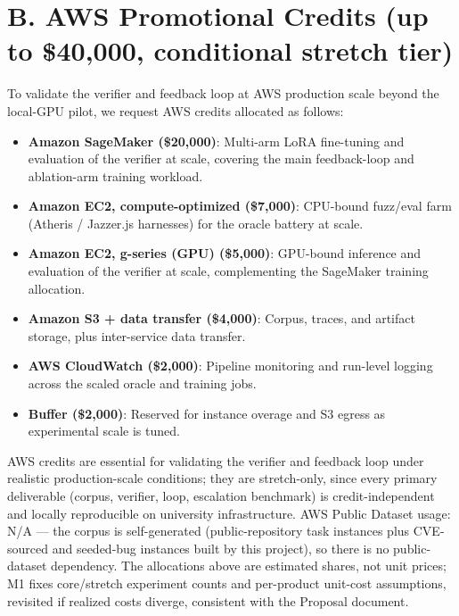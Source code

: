 \documentclass[11pt]{article}
\begin{document}
\section*{B. AWS Promotional Credits (up to \$40,000, conditional stretch tier)}
To validate the verifier and feedback loop at AWS production scale beyond the local-GPU pilot, we request AWS credits allocated as follows:
\begin{itemize}[leftmargin=1.3em, itemsep=0.5ex, topsep=2pt]
\item \textbf{Amazon SageMaker (\$20,000)}: Multi-arm LoRA fine-tuning and evaluation of the verifier at scale, covering the main feedback-loop and ablation-arm training workload.
\item \textbf{Amazon EC2, compute-optimized (\$7,000)}: CPU-bound fuzz/eval farm (Atheris / Jazzer.js harnesses) for the oracle battery at scale.
\item \textbf{Amazon EC2, g-series (GPU) (\$5,000)}: GPU-bound inference and evaluation of the verifier at scale, complementing the SageMaker training allocation.
\item \textbf{Amazon S3 + data transfer (\$4,000)}: Corpus, traces, and artifact storage, plus inter-service data transfer.
\item \textbf{AWS CloudWatch (\$2,000)}: Pipeline monitoring and run-level logging across the scaled oracle and training jobs.
\item \textbf{Buffer (\$2,000)}: Reserved for instance overage and S3 egress as experimental scale is tuned.
\end{itemize}

AWS credits are essential for validating the verifier and feedback loop under realistic production-scale conditions; they are stretch-only, since every primary deliverable (corpus, verifier, loop, escalation benchmark) is credit-independent and locally reproducible on university infrastructure. AWS Public Dataset usage: N/A --- the corpus is self-generated (public-repository task instances plus CVE-sourced and seeded-bug instances built by this project), so there is no public-dataset dependency. The allocations above are estimated shares, not unit prices; M1 fixes core/stretch experiment counts and per-product unit-cost assumptions, revisited if realized costs diverge, consistent with the Proposal document.
\end{document}
